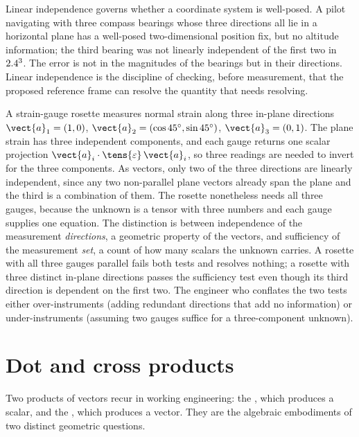 Linear independence governs whether a coordinate system is well-posed.
A pilot navigating with three compass bearings whose three directions
all lie in a horizontal plane has a well-posed two-dimensional
position fix, but no altitude information; the third bearing was not
linearly independent of the first two in $2.4^{3}$. The error is not
in the magnitudes of the bearings but in their directions. Linear
independence is the discipline of checking, before measurement, that
the proposed reference frame can resolve the quantity that needs
resolving.

\begin{example}
A strain-gauge rosette measures normal strain along three in-plane
directions $\vect{a}_{1} = (1, 0)$, $\vect{a}_{2} = (\cos 45^{\circ},
\sin 45^{\circ})$, $\vect{a}_{3} = (0, 1)$. The plane strain has three
independent components, and each gauge returns one scalar projection
$\vect{a}_{i}\cdot\tens{\varepsilon}\,\vect{a}_{i}$, so three readings
are needed to invert for the three components. As vectors, only two of
the three directions are linearly independent, since any two
non-parallel plane vectors already span the plane and the third is a
combination of them. The rosette nonetheless needs all three gauges,
because the unknown is a tensor with three numbers and each gauge
supplies one equation. The distinction is between independence of the
measurement \emph{directions}, a geometric property of the vectors,
and sufficiency of the measurement \emph{set}, a count of how many
scalars the unknown carries. A rosette with all three gauges parallel
fails both tests and resolves nothing; a rosette with three distinct
in-plane directions passes the sufficiency test even though its third
direction is dependent on the first two. The engineer who conflates
the two tests either over-instruments (adding redundant directions
that add no information) or under-instruments (assuming two gauges
suffice for a three-component unknown).
\end{example}

\section{Dot and cross products}

Two products of vectors recur in working engineering: the
, which produces a scalar, and the
, which produces a vector. They are the
algebraic embodiments of two distinct geometric questions.

